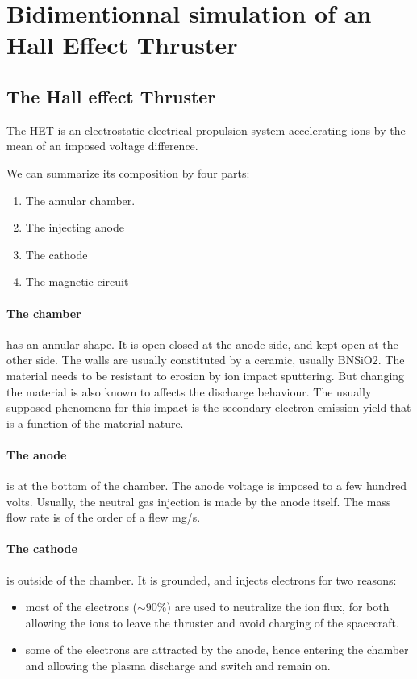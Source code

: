 
\section{Bidimentionnal simulation of an Hall Effect Thruster}


\subsection{The Hall effect Thruster }

The \ac{HET} is an electrostatic electrical propulsion system accelerating ions by the mean of an imposed voltage difference.

We can summarize its composition by four parts:
\begin{enumerate}
  \item The annular chamber.
  \item The injecting anode
  \item The cathode
  \item The magnetic circuit
\end{enumerate}

\paragraph{The chamber} has an annular shape.
It is open closed at the anode side, and kept open at the other side.
The walls are usually constituted by a ceramic, usually \ac{BNSiO2}.
The material needs to be resistant to erosion by ion impact sputtering.
But changing the material is also known to affects the discharge behaviour.
The usually supposed phenomena for this impact is the secondary electron emission yield that is a function of the material nature.


\paragraph{The anode} is at the bottom of the chamber.
The anode voltage is imposed to a few hundred volts.
Usually, the neutral gas injection is made by the anode itself.
The mass flow rate is of the order of a flew mg/s.

\paragraph{The cathode} is outside of the chamber.
It is grounded, and injects electrons for two reasons:
\begin{itemize}
  \item most of the electrons ($\sim 90 \%$) are used to neutralize the ion flux, for both allowing the ions to leave the thruster and avoid charging of the spacecraft.
  \item some of the electrons are attracted by the anode, hence entering the chamber and allowing the plasma discharge and switch and remain on.
\end{itemize}

